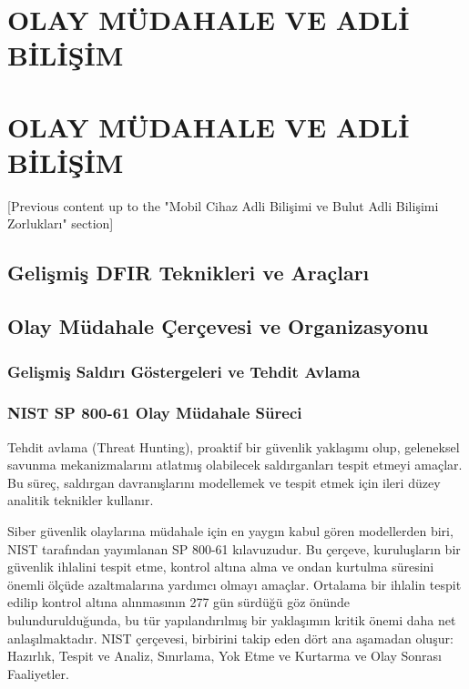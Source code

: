 \chapter{OLAY MÜDAHALE VE ADLİ BİLİŞİM}

\chapter{OLAY MÜDAHALE VE ADLİ BİLİŞİM}

[Previous content up to the "Mobil Cihaz Adli Bilişimi ve Bulut Adli Bilişimi Zorlukları" section]



\section{Gelişmiş DFIR Teknikleri ve Araçları}\section{Olay Müdahale Çerçevesi ve Organizasyonu}



\subsection{Gelişmiş Saldırı Göstergeleri ve Tehdit Avlama}\subsection{NIST SP 800-61 Olay Müdahale Süreci}

Tehdit avlama (Threat Hunting), proaktif bir güvenlik yaklaşımı olup, geleneksel savunma mekanizmalarını atlatmış olabilecek saldırganları tespit etmeyi amaçlar. Bu süreç, saldırgan davranışlarını modellemek ve tespit etmek için ileri düzey analitik teknikler kullanır.

Siber güvenlik olaylarına müdahale için en yaygın kabul gören modellerden biri, NIST tarafından yayımlanan SP 800-61 kılavuzudur. Bu çerçeve, kuruluşların bir güvenlik ihlalini tespit etme, kontrol altına alma ve ondan kurtulma süresini önemli ölçüde azaltmalarına yardımcı olmayı amaçlar. Ortalama bir ihlalin tespit edilip kontrol altına alınmasının 277 gün sürdüğü göz önünde bulundurulduğunda, bu tür yapılandırılmış bir yaklaşımın kritik önemi daha net anlaşılmaktadır. NIST çerçevesi, birbirini takip eden dört ana aşamadan oluşur: Hazırlık, Tespit ve Analiz, Sınırlama, Yok Etme ve Kurtarma ve Olay Sonrası Faaliyetler.

